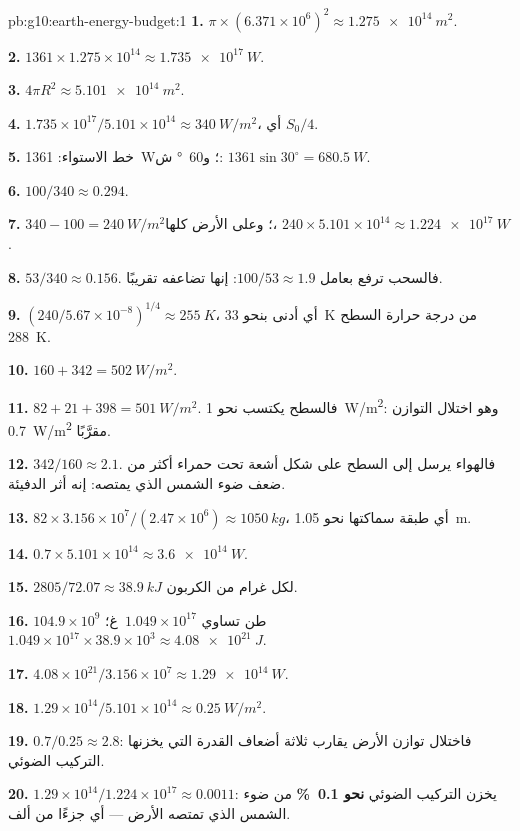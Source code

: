 \begin{solution}{pb:g10:earth-energy-budget:1}
\textbf{1.} $\pi \times (6.371\times10^6)^2 \approx \qty{1.275e14}{m^2}$.

\textbf{2.} $1361 \times 1.275\times10^{14} \approx \qty{1.735e17}{W}$.

\textbf{3.} $4\pi R^2 \approx \qty{5.101e14}{m^2}$.

\textbf{4.} $1.735\times10^{17}/5.101\times10^{14} \approx \qty{340}{W/m^2}$،
أي $S_0/4$.

\textbf{5.} خط الاستواء: \qty{1361}{W}؛ و\qty{60}{\degree} ش: $1361 \sin
30^\circ = \qty{680.5}{W}$.

\textbf{6.} $100/340 \approx 0.294$.

\textbf{7.} $340 - 100 = \qty{240}{W/m^2}$؛ وعلى الأرض كلها، $240 \times
5.101\times10^{14} \approx \qty{1.224e17}{W}$.

\textbf{8.} $53/340 \approx 0.156$. فالسحب ترفع  بعامل
$100/53 \approx 1.9$: إنها تضاعفه تقريبًا.

\textbf{9.} $(240/5.67\times10^{-8})^{1/4} \approx \qty{255}{K}$، أي أدنى بنحو
\qty{33}{K} من درجة حرارة السطح \qty{288}{K}.

\textbf{10.} $160 + 342 = \qty{502}{W/m^2}$.

\textbf{11.} $82 + 21 + 398 = \qty{501}{W/m^2}$. فالسطح يكتسب نحو
\qty{1}{W/m^2}: وهو اختلال التوازن \qty{0.7}{W/m^2} مقرَّبًا.

\textbf{12.} $342/160 \approx 2.1$. فالهواء يرسل إلى السطح على شكل أشعة تحت حمراء
أكثر من ضعف ضوء الشمس الذي يمتصه: إنه أثر الدفيئة.

\textbf{13.} $82 \times 3.156\times10^7/(2.47\times10^6) \approx
\qty{1050}{kg}$، أي طبقة سماكتها نحو \qty{1.05}{m}.

\textbf{14.} $0.7 \times 5.101\times10^{14} \approx \qty{3.6e14}{W}$.

\textbf{15.} $2805/72.07 \approx \qty{38.9}{kJ}$ لكل غرام من الكربون.

\textbf{16.} $104.9\times10^9$ طن تساوي $1.049\times10^{17}$~غ؛
$1.049\times10^{17} \times 38.9\times10^3 \approx \qty{4.08e21}{J}$.

\textbf{17.} $4.08\times10^{21}/3.156\times10^7 \approx \qty{1.29e14}{W}$.

\textbf{18.} $1.29\times10^{14}/5.101\times10^{14} \approx
\qty{0.25}{W/m^2}$.

\textbf{19.} $0.7/0.25 \approx 2.8$: فاختلال توازن الأرض يقارب ثلاثة أضعاف
القدرة التي يخزنها التركيب الضوئي.

\textbf{20.} $1.29\times10^{14}/1.224\times10^{17} \approx 0.0011$:
يخزن التركيب الضوئي \textbf{نحو \qty{0.1}{\percent}} من ضوء الشمس الذي تمتصه
الأرض --- أي جزءًا من ألف.
\end{solution}
